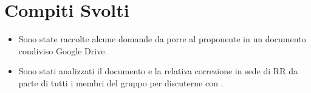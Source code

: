 \documentclass[../verbale-2017-02-07.tex]{subfiles}
\begin{document}
	\section{Compiti Svolti}
	\begin{itemize}
		\item Sono state raccolte alcune domande da porre al proponente in un documento condiviso Google Drive.
		\item Sono stati analizzati il documento \analisideirequisitiRR e la relativa correzione in sede di RR da parte di tutti i membri del gruppo per discuterne con \prop.
	\end{itemize}
\end{document}
